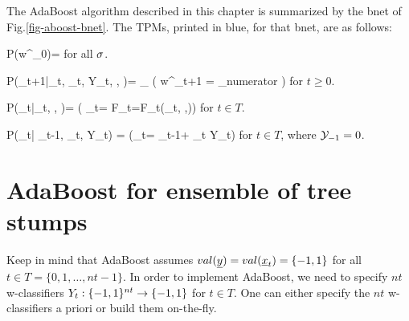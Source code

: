 The AdaBoost algorithm
described
in this chapter is summarized
by
the bnet of Fig.\ref{fig-aboost-bnet}.
The TPMs, printed in blue, for that
bnet, are as follows:

\beq\color{blue}
P(w^\s_0)=
\;
\eeq
for all $\sigma$.

\beq\color{blue}
P(_{t+1}|_{t},
\alp_t, Y_t,    , )=
\prod_\s
\indi(\;\;\;
w^\s_{t+1} =
{\sum_\s numerator}
\;\;\;)
\eeq
for $t\geq 0$.


\beq\color{blue}
P(\alp_t|_t, , )=
\indi(\;\;\; \alp_t=
\ln{}
F_t=F_t(_t, ,)\;\;\;)
\eeq
for $t\in T$.

\beq\color{blue}
P(\caly_t| \caly_{t-1}, \alp_t, Y_t)
=
\indi(\;\;\;\caly_t= \caly_{t-1}+ \alp_t Y_t\;\;\;)
\eeq
for $t\in T$,
where ${\cal Y}_{-1}=0$.

\section{AdaBoost for ensemble of tree stumps}

Keep in mind that
AdaBoost assumes
$val(\rvy)=val(\rvx_t)=\{-1, 1\}$
for all $t\in T=\{0,1, \ldots, nt-1\}$.
In order to implement
AdaBoost, we need to
specify
$nt$
w-classifiers $Y_t:\{-1, 1\}^{nt}
\rightarrow \{-1, 1\}$ for $t\in T$.
One can either
specify the $nt$ w-classifiers
a priori or build them
on-the-fly.

